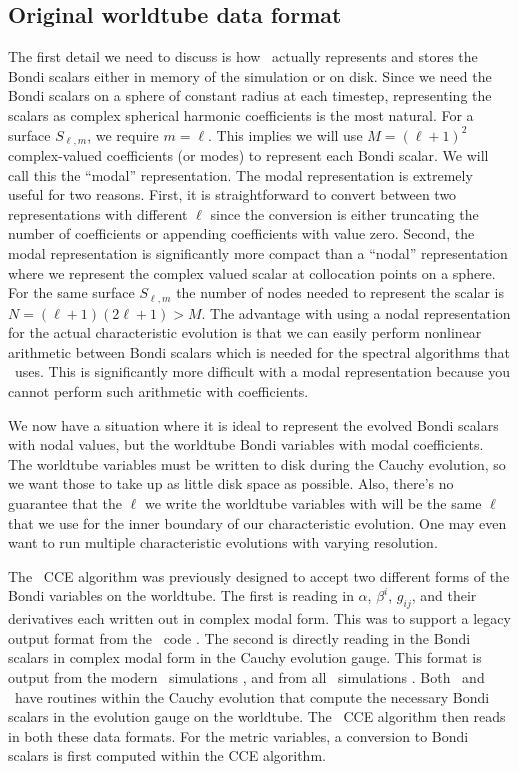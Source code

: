 \begin{bibunit}[unsrtnat]
\subsection{Original worldtube data format}
The first detail we need to discuss is how \spectre~actually represents and
stores the Bondi scalars either in memory of the simulation or on disk. Since we
need the Bondi scalars on a sphere of constant radius at each timestep,
representing the scalars as complex spherical harmonic coefficients is the most
natural. For a surface $S_{\ell,m}$, we require $m=\ell$. This implies we will
use $M = (\ell+1)^2$ complex-valued coefficients (or modes) to represent each
Bondi scalar. We will call this the ``modal'' representation. The modal
representation is extremely useful for two reasons. First, it is straightforward
to convert between two representations with different $\ell$ since the
conversion is either truncating the number of coefficients or appending
coefficients with value zero. Second, the modal representation is significantly
more compact than a ``nodal'' representation where we represent the complex
valued scalar at collocation points on a sphere. For the same surface
$S_{\ell,m}$ the number of nodes needed to represent the scalar is $N =
(\ell+1)(2\ell+1) > M$. The advantage with using a nodal representation for the
actual characteristic evolution is that we can easily perform nonlinear
arithmetic between Bondi scalars which is needed for the spectral algorithms
that \spectre~uses. This is significantly more difficult with a modal
representation because you cannot perform such arithmetic with coefficients.

We now have a situation where it is ideal to represent the evolved Bondi
scalars with nodal values, but the worldtube Bondi variables with modal
coefficients. The worldtube variables must be written to disk during the Cauchy
evolution, so we want those to take up as little disk space as possible. Also,
there's no guarantee that the $\ell$ we write the worldtube variables with will
be the same $\ell$ that we use for the inner boundary of our characteristic
evolution. One may even want to run multiple characteristic evolutions with
varying resolution.

The \spectre~CCE algorithm \cite{Moxon:2021gbv} was previously designed to
accept two different forms of the Bondi variables on the worldtube. The first is
reading in $\alpha$, $\beta^i$, $g_{ij}$, and their derivatives each written out
in complex modal form. This was to support a legacy output format from the
\spec~code \cite{Taylor:2013zia}. The second is directly reading in the Bondi
scalars in complex modal form in the Cauchy evolution gauge. This format is
output from the modern \spec~simulations \cite{Scheel:2025jct}, and from all
\spectre~simulations \cite{deppe_2025_16906840}. Both \spec~and \spectre~have
routines within the Cauchy evolution that compute the necessary Bondi scalars in
the evolution gauge on the worldtube. The \spectre~CCE algorithm then reads in
both these data formats. For the metric variables, a conversion to Bondi scalars
is first computed within the CCE algorithm.


\end{bibunit}
